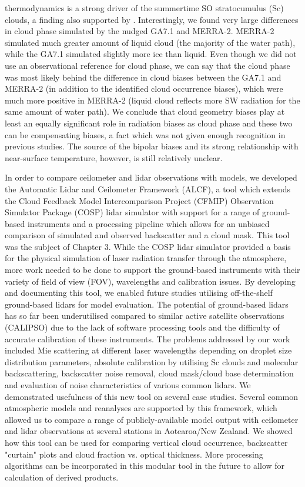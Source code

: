 thermodynamics is a strong driver of the summertime SO stratocumulus (Sc) clouds,
a finding also supported by \cite{hartery2020b}. Interestingly, we found
very large differences in cloud phase simulated by the nudged GA7.1 and MERRA-2.
MERRA-2 simulated much greater amount of liquid cloud (the majority of
the water path), while the GA7.1 simulated slightly more ice than liquid.
Even though we did not use an observational reference for cloud phase,
we can say that the cloud phase was most likely behind the difference in
cloud biases between the GA7.1 and MERRA-2 (in addition to the identified cloud occurrence biases), which were much more positive
in MERRA-2 (liquid cloud reflects more SW radiation for the same amount of water
path). We conclude that cloud geometry biases play at least an equally
significant role in radiation biases as cloud phase and these two can be
compensating biases, a fact which was not given enough recognition in previous
studies. The source of the bipolar biases and its strong relationship with
near-surface temperature, however, is still relatively unclear.

In order to compare ceilometer and lidar observations with models,
we developed the Automatic Lidar and Ceilometer Framework (ALCF),
a tool which extends the Cloud Feedback Model Intercomparison Project (CFMIP) Observation Simulator Package (COSP) lidar simulator with support for a range
of ground-based instruments and a processing pipeline which allows
for an unbiased comparison of simulated and observed backscatter and a cloud mask.
This tool was the subject of Chapter 3. While the COSP lidar simulator
provided a basis for the physical simulation of laser radiation transfer
through the atmosphere, more work needed to be done to support the ground-based
instruments with their variety of field of view (FOV), wavelengths and
calibration issues. By developing and documenting this tool, we enabled future
studies utilising off-the-shelf ground-based lidars for model evaluation.
The potential of ground-based lidars has so far been underutilised compared
to similar active satellite observations (CALIPSO) due to the
lack of software processing tools and the difficulty of accurate calibration
of these instruments. The problems addressed by our work included Mie
scattering at different laser wavelengths depending on droplet size distribution
parameters, absolute calibration by utilising Sc clouds and molecular
backscattering, backscatter noise removal, cloud mask/cloud base determination 
and evaluation of noise characteristics of various common lidars. We demonstrated
usefulness of this new tool on several case studies. Several common atmospheric
models and reanalyses are supported by this framework, which allowed us to compare
a range of publicly-available model output with ceilometer and lidar observations
at several stations in Aotearoa/New Zealand. We showed how this tool can be used
for comparing vertical cloud occurrence, backscatter "curtain" plots
and cloud fraction vs. optical thickness. More processing algorithms can
be incorporated in this modular tool in the future to allow for calculation of
derived products.

